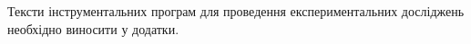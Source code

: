\label{appendix:A}

Тексти інструментальних програм для проведення експериментальних досліджень необхідно 
виносити у додатки.


